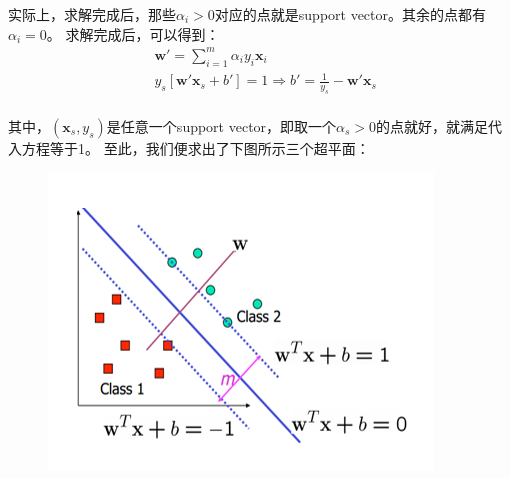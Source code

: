 \documentclass{article}
\begin{document}
实际上，求解完成后，那些$\alpha_i>0$对应的点就是support vector。其余的点都有$\alpha_i=0$。
求解完成后，可以得到：
\begin{equation}
	\begin{aligned}
		& \textbf{w}'=\sum_{i=1}^m\alpha_iy_i\textbf{x}_i\\
		& y_s[\textbf{w}'\textbf{x}_s+b']=1\Rightarrow b'=\frac{1}{y_s}-\textbf{w}'\textbf{x}_s\\
	\end{aligned}
\end{equation}

其中，$(\textbf{x}_s,y_s)$是任意一个support vector，即取一个$\alpha_s>0$的点就好，就满足代入方程等于1。
至此，我们便求出了下图所示三个超平面：
\begin{figure}[H]
	\centering
	\includegraphics[width=0.6\linewidth]{5.png}
\end{figure}
\end{document}
